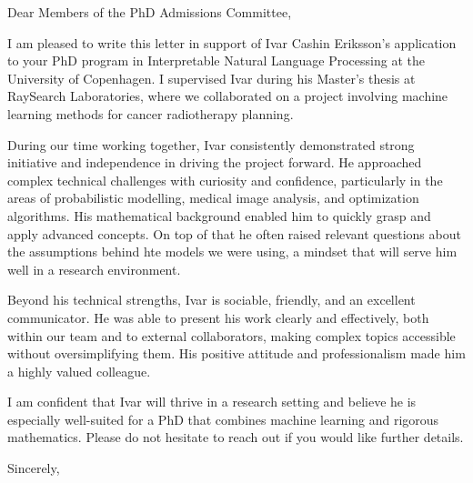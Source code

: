 \documentclass[11pt,a4paper]{letter}
\date{\today}
\begin{document}
\begin{letter}{}

\opening{Dear Members of the PhD Admissions Committee,}

I am pleased to write this letter in support of Ivar Cashin Eriksson's application to your PhD program in Interpretable Natural Language Processing at the University of Copenhagen. I supervised Ivar during his Master's thesis at RaySearch Laboratories, where we collaborated on a project involving machine learning methods for cancer radiotherapy planning.

During our time working together, Ivar consistently demonstrated strong initiative and independence in driving the project forward. He approached complex technical challenges with curiosity and confidence, particularly in the areas of probabilistic modelling, medical image analysis, and optimization algorithms. His mathematical background enabled him to quickly grasp and apply advanced concepts. On top of that he often raised relevant questions about the assumptions behind hte models we were using, a mindset that will serve him well in a research environment.

Beyond his technical strengths, Ivar is sociable, friendly, and an excellent communicator. He was able to present his work clearly and effectively, both within our team and to external collaborators, making complex topics accessible without oversimplifying them. His positive attitude and professionalism made him a highly valued colleague.

I am confident that Ivar will thrive in a research setting and believe he is especially well-suited for a PhD that combines machine learning and rigorous mathematics. Please do not hesitate to reach out if you would like further details.

\closing{Sincerely,}

\end{letter}
\end{document}
